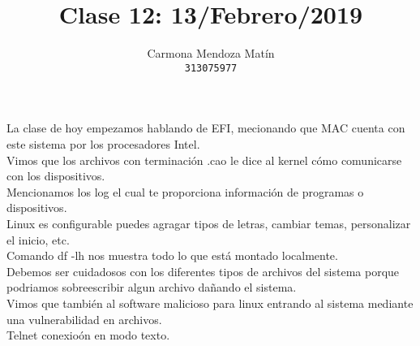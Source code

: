 \documentclass[11pt, a4paper]{report}
\begin{document}
\title{Clase 12: 13/Febrero/2019}
\author{
  Carmona Mendoza Mat\'in\\
  \texttt{313075977}
}
\date{}
\maketitle

La clase de hoy empezamos hablando de EFI, mecionando que MAC cuenta con este sistema por los procesadores Intel. \\

Vimos que los archivos con terminación .cao le dice al kernel cómo comunicarse con los dispositivos. \\

Mencionamos los log el cual te proporciona información de programas o dispositivos. \\

Linux es configurable puedes agragar tipos de letras, cambiar temas, personalizar el inicio, etc. \\

Comando df -lh nos muestra todo lo que está montado localmente. \\

Debemos ser cuidadosos con los diferentes tipos de archivos  del sistema porque podriamos sobreescribir algun
archivo dañando el sistema. \\

Vimos que también al software malicioso para linux entrando al sistema mediante una vulnerabilidad en archivos. \\

Telnet conexioón en modo texto.
\end{document}
